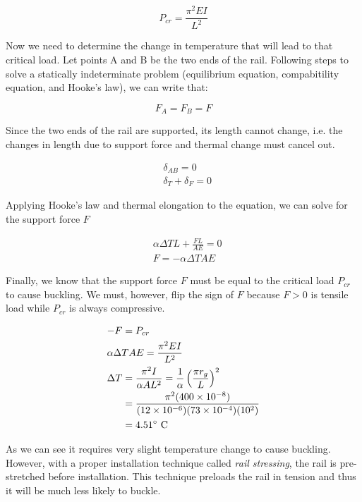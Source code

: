 \documentclass[a4paper,openany,nobib]{tufte-book}
\begin{document}
{{\begin{equation}
  P_{cr} = \frac{ \pi^2 EI }{ L^2 } 
\end{equation}

Now we need to determine the change in temperature that will lead to
that critical load. Let points A and B be the two ends of the rail.
Following steps to solve a statically indeterminate problem (equilibrium
equation, compabitility equation, and Hooke's law), we can write that:

\begin{equation*}
  F_A = F_B = F
\end{equation*}

Since the two ends of the rail are supported, its length cannot change,
i.e. the changes in length due to support force and thermal change must
cancel out.

\begin{gather*}
  &\delta_{AB} = 0 \\
  &\delta_T + \delta_F = 0
\end{gather*}

Applying Hooke's law and thermal elongation to the equation, we can
solve for the support force \(F\)

\begin{align*}
  &\alpha \Delta T L + \frac {FL}{AE} = 0 \\
  &F = -\alpha \Delta T A E
\end{align*}

Finally, we know that the support force \(F\) must be equal to the
critical load \(P_{cr}\) to cause buckling. We must, however, flip the
sign of \(F\) because \(F > 0\) is tensile load while \(P_{cr}\) is always
compressive.

\begin{gather*}
  -F = P_{cr} \hfill \\
  \alpha \Delta T A E = \frac{ \pi^2 EI }{ L^2 } \hfill \\
  \begin{aligned}
    \Delta T &= \frac{ \pi^2 I }{ \alpha A L^2} = \frac{1}{\alpha} \left( \frac{ \pi r_g }{L} \right)^2 \\
    &= \frac{ \pi^2 (400 \times 10^{-8}) }{ (12 \times 10^{-6})(73 \times 10^{-4})(10^2)}\\
    &= 4.51^{\circ} \text{ C}
   \end{aligned}
\end{gather*}

As we can see it requires very slight temperature change to cause
buckling. However, with a proper installation technique called \emph{rail
stressing}, the rail is pre-stretched before installation. This
technique preloads the rail in tension and thus it will be much less
likely to buckle.

}}
\end{document}
